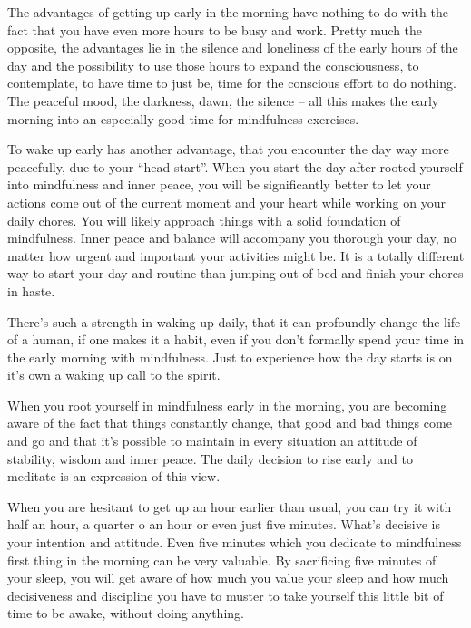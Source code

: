\documentclass[../main.tex]{subfiles}
\begin{document}
The advantages of getting up early\label{Ex:EarlyMorning} in the morning have nothing to do with the fact that you have even more hours to be busy and work.
Pretty much the opposite, the advantages lie in the silence and loneliness of the early hours of the day
and the possibility to use those hours to expand the consciousness, to contemplate,
to have time to just be, time for the conscious effort to do nothing.
The peaceful mood, the darkness, dawn, the silence -- all this makes the early morning into an especially good time for mindfulness exercises.

To wake up early has another advantage, that you encounter the day way more peacefully, due to your ``head start''.
When you start the day after rooted yourself into mindfulness and inner peace, you will be significantly better to let your actions come out of the current moment and your heart while working on your daily chores.
You will likely approach things with a solid foundation of mindfulness.
Inner peace and balance will accompany you thorough your day, no matter how urgent and important your activities might be.
It is a totally different way to start your day and routine than jumping out  of bed and finish your chores in haste.

There's such a strength in waking up daily, that it can profoundly change the life of a human,
if one makes it a habit, even if you don't formally spend your time in the early morning with mindfulness.
Just to experience how the day starts is on it's own a waking up call to the spirit.

When you root yourself in mindfulness early in the morning, you are becoming aware of the fact that things constantly change, that good and bad things come and go
and that it's possible to maintain in every situation an attitude of stability, wisdom and inner peace.
The daily decision to rise early and to meditate is an expression of this view.

When you are hesitant to get up an hour earlier than usual, you can try it with half an hour, a quarter o an hour or even just five minutes.
What's decisive is your intention and attitude.
Even five minutes which you dedicate to mindfulness first thing in the morning can be very valuable.
By sacrificing five minutes of your sleep, you will get aware of how much you value your sleep and how much decisiveness and discipline you have to muster to take yourself this little bit of time to be awake, without doing anything.
\end{document}
